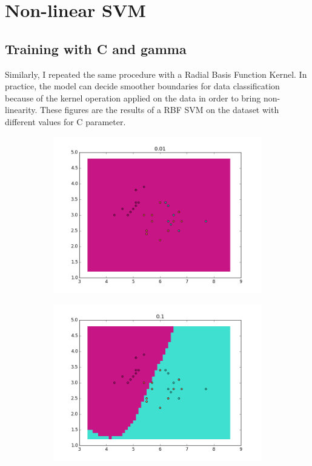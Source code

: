 \documentclass{article}
\begin{document}
\section{Non-linear SVM}
\subsection{Training with C and gamma}
	Similarly, I repeated the same procedure with a Radial Basis Function Kernel. In practice, the model can decide smoother boundaries for data classification because of the kernel operation applied on the data in order to bring non-linearity.
	These figures are the results of a RBF SVM on the dataset with different values for C parameter. 
				
												\begin{center}
				\begin{figure}
\centering
        \begin{subfigure}[b]{0.48\textwidth}
                \centering
                \includegraphics[width=\linewidth]{figure_11}
        \end{subfigure}\hfill
        \begin{subfigure}[b]{0.48\textwidth}
                \centering
                \includegraphics[width=\linewidth]{figure_12}
        \end{subfigure}\hfill
 \label{fig:7}
 \end{figure}
       

\end{center}
\end{document}
